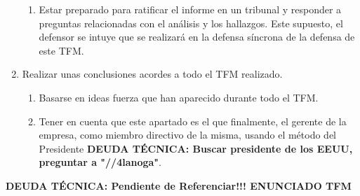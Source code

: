 \begin{enumerate}
\begin{enumerate}
        \item Estar preparado para ratificar el informe en un tribunal y responder a preguntas relacionadas con el análisis y los hallazgos. Este supuesto, el defensor se intuye que se realizará en la defensa síncrona de la defensa de este TFM.
    \end{enumerate}
    \item Realizar unas conclusiones acordes a todo el TFM realizado.
    \begin{enumerate}
        \item Basarse en ideas fuerza que han aparecido durante todo el TFM.
        \item Tener en cuenta que este apartado es el que finalmente, el gerente de la empresa, como miembro directivo de la misma, usando el método del Presidente {\color{red}\textbf{DEUDA TÉCNICA: Buscar presidente de los EEUU, preguntar a "//4lanoga"}}.
    \end{enumerate}
\end{enumerate}


{\color{red}\textbf{DEUDA TÉCNICA: Pendiente de Referenciar!!! ENUNCIADO TFM}}


